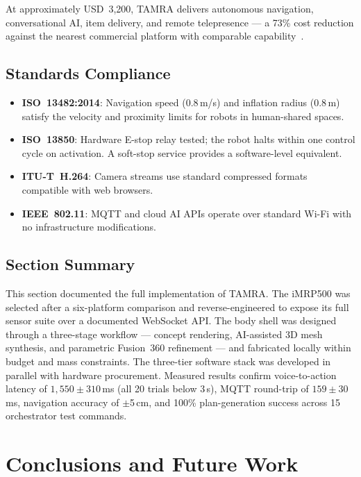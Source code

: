 \documentclass[11pt,a4paper]{article}
\begin{document}
\noindent At approximately USD~3{,}200, TAMRA delivers autonomous navigation, conversational AI, item delivery, and remote telepresence --- a 73\% cost reduction against the nearest commercial platform with comparable capability~\cite{pudubot2,m2medical}.

\subsection{Standards Compliance}

\begin{itemize}
  \item \textbf{ISO~13482:2014}: Navigation speed (0.8\,m/s) and inflation radius (0.8\,m) satisfy the velocity and proximity limits for robots in human-shared spaces.
  \item \textbf{ISO~13850}: Hardware E-stop relay tested; the robot halts within one control cycle on activation. A soft-stop service provides a software-level equivalent.
  \item \textbf{ITU-T~H.264}: Camera streams use standard compressed formats compatible with web browsers.
  \item \textbf{IEEE~802.11}: MQTT and cloud AI APIs operate over standard Wi-Fi with no infrastructure modifications.
\end{itemize}

\subsection{Section Summary}

This section documented the full implementation of TAMRA. The iMRP500 was selected after a six-platform comparison and reverse-engineered to expose its full sensor suite over a documented WebSocket API. The body shell was designed through a three-stage workflow --- concept rendering, AI-assisted 3D mesh synthesis, and parametric Fusion~360 refinement --- and fabricated locally within budget and mass constraints. The three-tier software stack was developed in parallel with hardware procurement. Measured results confirm voice-to-action latency of $1{,}550 \pm 310$\,ms (all 20 trials below 3\,s), MQTT round-trip of $159 \pm 30$\,ms, navigation accuracy of $\pm$5\,cm, and 100\% plan-generation success across 15 orchestrator test commands.

\section{Conclusions and Future Work}
\label{sec:conclusion}
\end{document}
